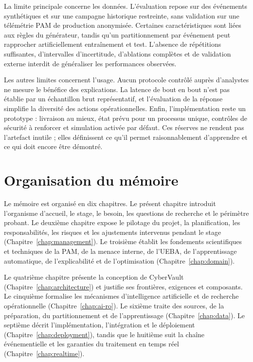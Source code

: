 \documentclass[11pt,a4paper,oneside]{report}
\theoremstyle{definition}
\theoremstyle{plain}
\begin{document}
La limite principale concerne les données. L'évaluation repose sur des
événements synthétiques et sur une campagne historique restreinte, sans
validation sur une télémétrie PAM de production anonymisée. Certaines
caractéristiques sont liées aux règles du générateur, tandis qu'un
partitionnement par événement peut rapprocher artificiellement entraînement
et test. L'absence de répétitions suffisantes, d'intervalles d'incertitude,
d'ablations complètes et de validation externe interdit de généraliser les
performances observées.

Les autres limites concernent l'usage. Aucun protocole contrôlé auprès
d'analystes ne mesure le bénéfice des explications. La latence de bout en bout
n'est pas établie par un échantillon brut représentatif, et l'évaluation de la
réponse simplifie la diversité des actions opérationnelles. Enfin,
l'implémentation reste un prototype : livraison au mieux, état prévu pour un
processus unique, contrôles de sécurité à renforcer et simulation activée par
défaut. Ces réserves ne rendent pas l'artefact inutile ; elles définissent ce
qu'il permet raisonnablement d'apprendre et ce qui doit encore être démontré.

\section{Organisation du mémoire}
\label{sec:intro-outline}

Le mémoire est organisé en dix chapitres. Le présent chapitre introduit
l'organisme d'accueil, le stage, le besoin, les questions de recherche et le
périmètre probant. Le deuxième chapitre expose le pilotage du projet, la
planification, les responsabilités, les risques et les ajustements intervenus
pendant le stage (Chapitre~\ref{chap:management}). Le troisième établit les
fondements scientifiques et techniques de la PAM, de la menace interne, de
l'UEBA, de l'apprentissage automatique, de l'explicabilité et de
l'optimisation (Chapitre~\ref{chap:domain}).

Le quatrième chapitre présente la conception de
CyberVault (Chapitre~\ref{chap:architecture}) et justifie ses frontières,
exigences et composants. Le cinquième formalise les mécanismes d'intelligence
artificielle et de recherche opérationnelle
(Chapitre~\ref{chap:ai-ro}). Le sixième traite des sources, de la préparation,
du partitionnement et de l'apprentissage
(Chapitre~\ref{chap:data}). Le septième décrit l'implémentation,
l'intégration et le déploiement (Chapitre~\ref{chap:deployment}), tandis que
le huitième suit la chaîne événementielle et les garanties du traitement en
temps réel (Chapitre~\ref{chap:realtime}).
\end{document}
